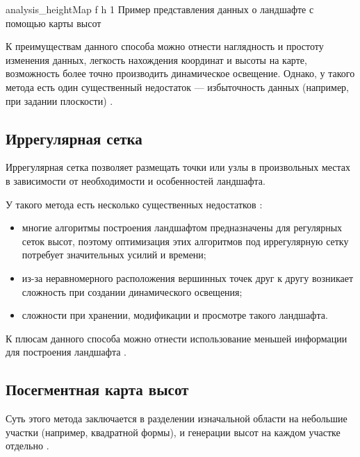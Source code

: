 \clearpage

{analysis_heightMap} %
{f} %
{h} %
{1\textwidth} %
{Пример представления данных о ландшафте с помощью карты высот \cite{info_heightMap}} %

К преимуществам данного способа можно отнести наглядность и простоту изменения данных, легкость нахождения координат и высоты на карте, возможность более точно производить динамическое освещение. 
Однако, у такого метода есть один существенный недостаток --- избыточность данных (например, при задании плоскости) \cite{info_dataLandscapePresent}.

\subsection{Иррегулярная сетка}

Иррегулярная сетка позволяет размещать точки или узлы в произвольных местах в зависимости от необходимости и особенностей ландшафта.

У такого метода есть несколько существенных недостатков \cite{info_dataLandscapePresent}:

\begin{itemize}[label=--]
	\item многие алгоритмы построения ландшафтом предназначены для регулярных сеток высот, поэтому оптимизация этих алгоритмов под иррегулярную сетку потребует значительных усилий и времени;
	\item из-за неравномерного расположения вершинных точек друг к другу возникает сложность при создании динамического освещения;
	\item сложности при хранении, модификации и просмотре такого ландшафта.
\end{itemize}

К плюсам данного способа можно отнести использование меньшей информации для построения ландшафта \cite{info_dataLandscapePresent}. 

\subsection{Посегментная карта высот}

Суть этого метода заключается в разделении изначальной области на
небольшие участки (например, квадратной формы), и генерации высот на
каждом участке отдельно \cite{info_dataLandscapeSegment}.

